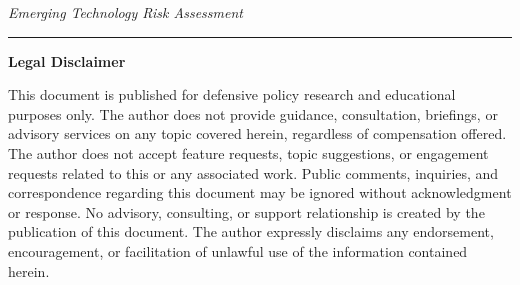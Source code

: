 \documentclass[11pt,letterpaper]{article}
\begin{document}
\vspace{0.3cm}

\begin{center}
\textit{Emerging Technology Risk Assessment}
\end{center}

\vspace{0.6cm}

\noindent\rule{\textwidth}{0.4pt}

\vspace{0.3cm}

\begin{center}
\small\textbf{Legal Disclaimer}
\end{center}

\vspace{0.2cm}

\noindent\small This document is published for defensive policy research and educational purposes only. The author does not provide guidance, consultation, briefings, or advisory services on any topic covered herein, regardless of compensation offered. The author does not accept feature requests, topic suggestions, or engagement requests related to this or any associated work. Public comments, inquiries, and correspondence regarding this document may be ignored without acknowledgment or response. No advisory, consulting, or support relationship is created by the publication of this document. The author expressly disclaims any endorsement, encouragement, or facilitation of unlawful use of the information contained herein.
\end{document}

